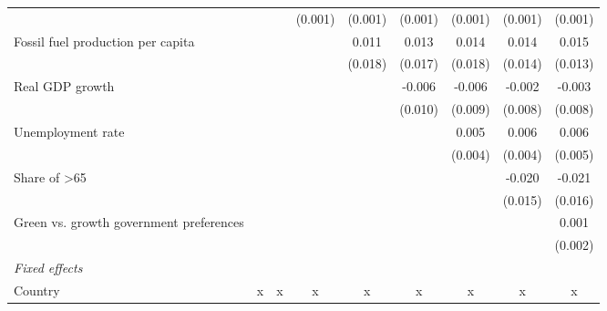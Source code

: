 \begin{table}[htbp]
\begin{tabular}{lcccccccc}
                                              &                &                & (0.001)       & (0.001)       & (0.001)       & (0.001)       & (0.001)        & (0.001)\\   
      Fossil fuel production per capita       &                &                &               & 0.011         & 0.013         & 0.014         & 0.014          & 0.015\\   
                                              &                &                &               & (0.018)       & (0.017)       & (0.018)       & (0.014)        & (0.013)\\   
      Real GDP growth                         &                &                &               &               & -0.006        & -0.006        & -0.002         & -0.003\\   
                                              &                &                &               &               & (0.010)       & (0.009)       & (0.008)        & (0.008)\\   
      Unemployment rate                       &                &                &               &               &               & 0.005         & 0.006          & 0.006\\   
                                              &                &                &               &               &               & (0.004)       & (0.004)        & (0.005)\\   
      Share of >65                            &                &                &               &               &               &               & -0.020         & -0.021\\   
                                              &                &                &               &               &               &               & (0.015)        & (0.016)\\   
      Green vs. growth government preferences &                &                &               &               &               &               &                & 0.001\\   
                                              &                &                &               &               &               &               &                & (0.002)\\   
      \emph{Fixed effects}\\
      Country                                 & x              & x              & x             & x             & x             & x             & x              & x\\  

\end{tabular}
\end{table}
